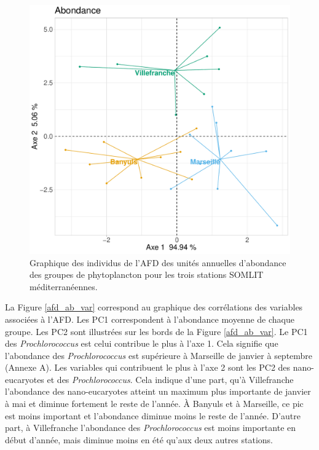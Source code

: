 \documentclass[12pt]{article}
\begin{document}
\begin{figure}
\centering
\includegraphics[width=.65\textwidth]{fig/R221_FDA_ab.pdf}
\caption{Graphique des individus de l'AFD des unités annuelles d'abondance des groupes de phytoplancton pour les trois stations SOMLIT méditerranéennes.}
\label{afd_ab}
\end{figure}

La Figure \ref{afd_ab_var} correspond au graphique des corrélations des variables associées à l’AFD. Les PC1 correspondent à l’abondance moyenne de chaque groupe. Les PC2 sont illustrées sur les bords de la Figure \ref{afd_ab_var}. Le PC1 des \textit{Prochlorococcus} est celui contribue le plus à l’axe 1. Cela signifie que l’abondance des \textit{Prochlorococcus} est supérieure à Marseille de janvier à septembre (Annexe A).  Les variables qui contribuent le plus à l’axe 2 sont les PC2 des nano-eucaryotes et des \textit{Prochlorococcus}. Cela indique d’une part, qu’à Villefranche l’abondance des nano-eucaryotes atteint un maximum plus importante de janvier à mai et diminue fortement le reste de l’année. À Banyuls et à Marseille, ce pic est moins important et l’abondance diminue moins le reste de l’année. D’autre part, à Villefranche l’abondance des \textit{Prochlorococcus} est moins importante en début d’année, mais diminue moins en été qu’aux deux autres stations.
\end{document}

